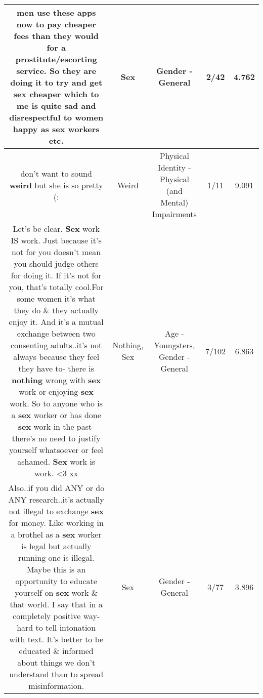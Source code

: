 \documentclass[11pt]{article}
\newlength\mylength
\begin{document}
\begin{center}
\begin{longtable}{|C{.65\mylength}|C{.30\mylength}|C{.12\mylength}|C{.12\mylength}|C{.12\mylength}|}
  \small men use these apps now to pay cheaper fees than they would for a prostitute/escorting service. So they are doing it to try and get \textbf{sex} cheaper which to me is quite sad and disrespectful to women happy as \textbf{sex} workers etc.\normalsize   & Sex & Gender - General & 2/42 & 4.762 \\  \hline
  \small don't want to sound \textbf{weird} but she is so pretty (:\normalsize   & Weird & Physical Identity - Physical (and Mental) Impairments & 1/11 & 9.091 \\  \hline
  \small Let's be clear. \textbf{Sex} work IS work. Just because it's not for you doesn't mean you should judge others for doing it. If it's not for you, that's totally cool.For some women it's what they do \& they actually enjoy it. And it's a mutual exchange between two consenting adults..it's not always because they feel they have to- there is \textbf{nothing} wrong with \textbf{sex} work or enjoying \textbf{sex} work. So to anyone who is a \textbf{sex} worker or has done \textbf{sex} work in the past- there's no need to justify yourself whatsoever or feel ashamed. \textbf{Sex} work is work. <3 xx\normalsize   & Nothing, Sex & Age - Youngsters, Gender - General & 7/102 & 6.863 \\  \hline
  \small Also..if you did ANY or do ANY research..it's actually not illegal to exchange \textbf{sex} for money. Like working in a brothel as a \textbf{sex} worker is legal but actually running one is illegal. Maybe this is an opportunity to educate yourself on \textbf{sex} work \& that world. I say that in a completely positive way- hard to tell intonation with text. It's better to be educated \& informed about things we don't understand than to spread misinformation.\normalsize   & Sex & Gender - General & 3/77 & 3.896 \\  \hline

\end{longtable}
\end{center}
\end{document}
